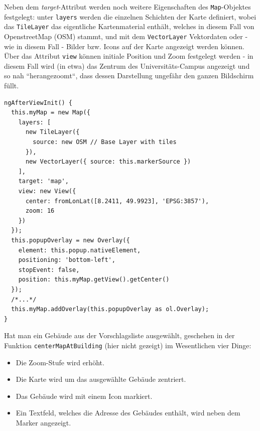 Neben dem \textit{target}-Attribut werden noch weitere Eigenschaften des \texttt{Map}-Objektes festgelegt: unter \texttt{layers} werden die einzelnen Schichten der Karte definiert, wobei das \texttt{TileLayer} das eigentliche Kartenmaterial enthält, welches in diesem Fall von OpenstreetMap (OSM) stammt, und mit dem \texttt{VectorLayer} Vektordaten oder - wie in diesem Fall - Bilder bzw. Icons auf der Karte angezeigt werden können. Über das Attribut \texttt{view} können initiale Position und Zoom festgelegt werden - in diesem Fall wird (in etwa) das Zentrum des Universitäts-Campus angezeigt  und so nah ``herangezoomt``, dass dessen Darstellung ungefähr den ganzen Bildschirm füllt.
\begin{lstlisting}[float, floatplacement=h, style=htmlcssjs, caption={Initialisieren der Karte}, label={Map}]
ngAfterViewInit() {
  this.myMap = new Map({
    layers: [
      new TileLayer({
        source: new OSM // Base Layer with tiles
      }),
      new VectorLayer({ source: this.markerSource })
    ],
    target: 'map',
    view: new View({
      center: fromLonLat([8.2411, 49.9923], 'EPSG:3857'),
      zoom: 16
    })
  });
  this.popupOverlay = new Overlay({
    element: this.popup.nativeElement,
    positioning: 'bottom-left',
    stopEvent: false,
    position: this.myMap.getView().getCenter()
  });
  /*...*/
  this.myMap.addOverlay(this.popupOverlay as ol.Overlay);
}
\end{lstlisting}
Hat man ein Gebäude aus der Vorschlagsliste ausgewählt, geschehen in der Funktion \texttt{centerMapAtBuilding} (hier nicht gezeigt) im Wesentlichen vier Dinge: 

\begin{itemize}
\item Die Zoom-Stufe wird erhöht.
\item Die Karte wird um das ausgewählte Gebäude zentriert.
\item Das Gebäude wird mit einem Icon markiert.
\item Ein Textfeld, welches die Adresse des Gebäudes enthält, wird neben dem Marker angezeigt.
\end{itemize}

